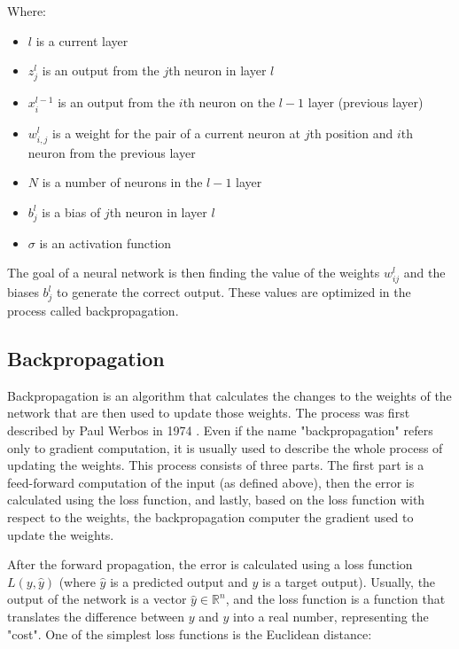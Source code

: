 \newpage

Where:

\begin{itemize}
    \item $l$ is a current layer
    \item $z_j^l$ is an output from the $j$th neuron in layer $l$
    \item $x_i^{l-1}$ is an output from the $i$th neuron on the $l-1$ layer (previous layer)
    \item $w_{i,j}^l$ is a weight for the pair of a current neuron at $j$th position and $i$th neuron from the previous layer
    \item $N$ is a number of neurons in the $l-1$ layer
    \item $b_j^l$ is a bias of $j$th neuron in layer $l$
    \item $\sigma$ is an activation function
\end{itemize}

The goal of a neural network is then finding the value of the weights $w_{ij}^l$ and the biases $b_j^l$ to generate the correct output. These values are optimized in the process called backpropagation.

\subsection{Backpropagation}

Backpropagation is an algorithm that calculates the changes to the weights of the network that are then used to update those weights. The process was first described by Paul Werbos in 1974 \cite{werbos1974beyond}. Even if the name "backpropagation" refers only to gradient computation, it is usually used to describe the whole process of updating the weights. This process consists of three parts. The first part is a feed-forward computation of the input (as defined above), then the error is calculated using the loss function, and lastly, based on the loss function with respect to the weights, the backpropagation computer the gradient used to update the weights.

\vspace{\baselineskip}

After the forward propagation, the error is calculated using a loss function $L(y,\hat{y})$ (where $\hat{y}$ is a predicted output and $y$ is a target output). Usually, the output of the network is a vector $\hat{y} \in \mathbb{R}^n$, and the loss function is a function that translates the difference between $y$ and $y$ into a real number, representing the "cost". One of the simplest loss functions is the Euclidean distance:

